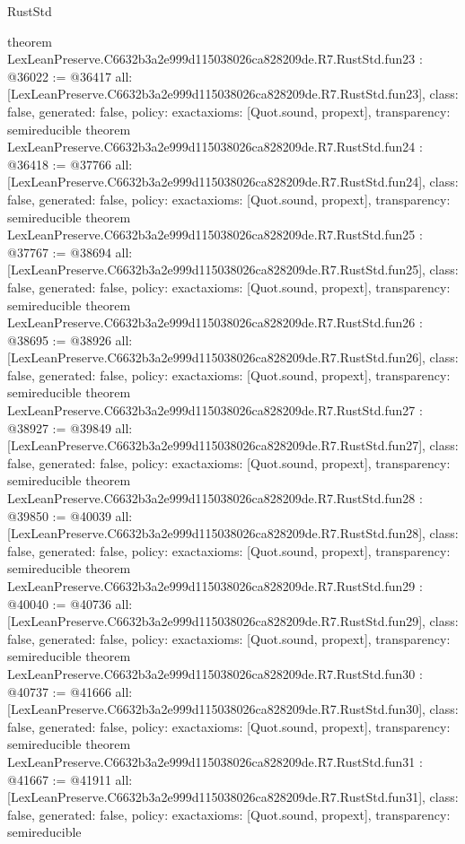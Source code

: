 \begin{lexlean}{RustStd}
\begin{coremodule}
{}
theorem LexLeanPreserve.C6632b3a2e999d115038026ca828209de.R7.RustStd.fun23 : @36022 := @36417 {
  all: [LexLeanPreserve.C6632b3a2e999d115038026ca828209de.R7.RustStd.fun23],
  class: false,
  generated: false,
  policy: exact{axioms: [Quot.sound, propext]},
  transparency: semireducible
}
theorem LexLeanPreserve.C6632b3a2e999d115038026ca828209de.R7.RustStd.fun24 : @36418 := @37766 {
  all: [LexLeanPreserve.C6632b3a2e999d115038026ca828209de.R7.RustStd.fun24],
  class: false,
  generated: false,
  policy: exact{axioms: [Quot.sound, propext]},
  transparency: semireducible
}
theorem LexLeanPreserve.C6632b3a2e999d115038026ca828209de.R7.RustStd.fun25 : @37767 := @38694 {
  all: [LexLeanPreserve.C6632b3a2e999d115038026ca828209de.R7.RustStd.fun25],
  class: false,
  generated: false,
  policy: exact{axioms: [Quot.sound, propext]},
  transparency: semireducible
}
theorem LexLeanPreserve.C6632b3a2e999d115038026ca828209de.R7.RustStd.fun26 : @38695 := @38926 {
  all: [LexLeanPreserve.C6632b3a2e999d115038026ca828209de.R7.RustStd.fun26],
  class: false,
  generated: false,
  policy: exact{axioms: [Quot.sound, propext]},
  transparency: semireducible
}
theorem LexLeanPreserve.C6632b3a2e999d115038026ca828209de.R7.RustStd.fun27 : @38927 := @39849 {
  all: [LexLeanPreserve.C6632b3a2e999d115038026ca828209de.R7.RustStd.fun27],
  class: false,
  generated: false,
  policy: exact{axioms: [Quot.sound, propext]},
  transparency: semireducible
}
theorem LexLeanPreserve.C6632b3a2e999d115038026ca828209de.R7.RustStd.fun28 : @39850 := @40039 {
  all: [LexLeanPreserve.C6632b3a2e999d115038026ca828209de.R7.RustStd.fun28],
  class: false,
  generated: false,
  policy: exact{axioms: [Quot.sound, propext]},
  transparency: semireducible
}
theorem LexLeanPreserve.C6632b3a2e999d115038026ca828209de.R7.RustStd.fun29 : @40040 := @40736 {
  all: [LexLeanPreserve.C6632b3a2e999d115038026ca828209de.R7.RustStd.fun29],
  class: false,
  generated: false,
  policy: exact{axioms: [Quot.sound, propext]},
  transparency: semireducible
}
theorem LexLeanPreserve.C6632b3a2e999d115038026ca828209de.R7.RustStd.fun30 : @40737 := @41666 {
  all: [LexLeanPreserve.C6632b3a2e999d115038026ca828209de.R7.RustStd.fun30],
  class: false,
  generated: false,
  policy: exact{axioms: [Quot.sound, propext]},
  transparency: semireducible
}
theorem LexLeanPreserve.C6632b3a2e999d115038026ca828209de.R7.RustStd.fun31 : @41667 := @41911 {
  all: [LexLeanPreserve.C6632b3a2e999d115038026ca828209de.R7.RustStd.fun31],
  class: false,
  generated: false,
  policy: exact{axioms: [Quot.sound, propext]},
  transparency: semireducible
}
\end{coremodule}
\end{lexlean}
